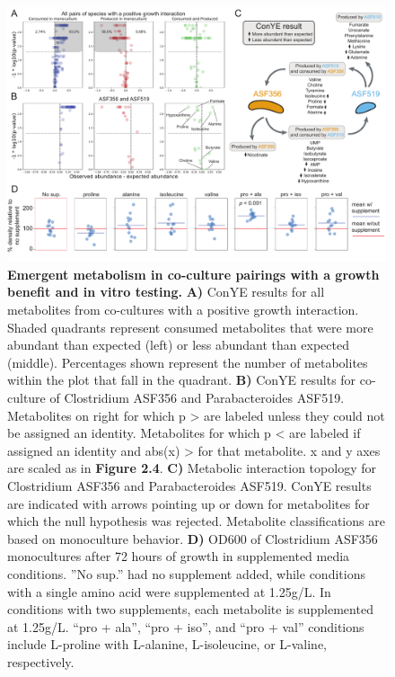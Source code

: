 \documentclass[11pt,onecolumn,notitlepage,openany,twoside]{book}
\begin{document}
\begin{refsection}
\begin{figure}[tb!]
\centering
\includegraphics[width=\textwidth]{ch2_fig6}
\caption[Emergent metabolism in co-culture pairings with a growth benefit and in vitro testing.]{\textbf{Emergent metabolism in co-culture pairings with a growth benefit and in vitro testing.} \textbf{A)} ConYE results for all metabolites from co-cultures with a positive growth interaction. Shaded quadrants represent consumed metabolites that were more abundant than expected (left) or less abundant than expected (middle). Percentages shown represent the number of metabolites within the plot that fall in the quadrant. \textbf{B)} ConYE results for co-culture of Clostridium ASF356 and Parabacteroides ASF519. Metabolites on right for which p \textgreater{} are labeled unless they could not be assigned an identity. Metabolites for which p \textless{} are labeled if assigned an identity and abs(x) \textgreater{} for that metabolite. x and y axes are scaled as in \textbf{Figure 2.4}. \textbf{C)} Metabolic interaction topology for Clostridium ASF356 and Parabacteroides ASF519. ConYE results are indicated with arrows pointing up or down for metabolites for which the null hypothesis was rejected. Metabolite classifications are based on monoculture behavior. \textbf{D)} OD600 of Clostridium ASF356 monocultures after 72 hours of growth in supplemented media conditions. ”No sup.” had no supplement added, while conditions with a single amino acid were supplemented at 1.25g/L. In conditions with two supplements, each metabolite is supplemented at 1.25g/L. “pro + ala”, “pro + iso”, and “pro + val” conditions include L-proline with L-alanine, L-isoleucine, or L-valine, respectively.}
\end{figure}


\end{refsection}
\end{document}
